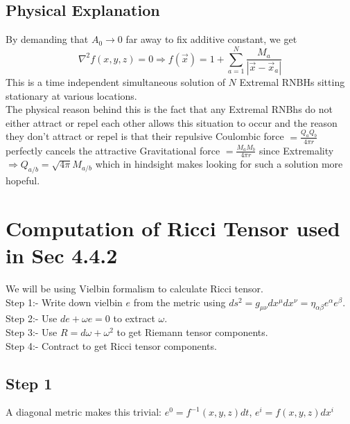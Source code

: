 ﻿\documentclass[12pt,a4paper]{article}
\begin{document}
\subsection{Physical Explanation}
By demanding that $A_{0} \rightarrow 0$ far away to fix additive constant, we get
$$
\nabla^{2} f(x, y, z)=0 \Rightarrow f(\vec{x})=1+\sum_{a=1}^{N} \frac{M_{a}}{\left|\vec{x}-\vec{x}_{a}\right|}
$$
This is a time independent simultaneous solution of $N$ Extremal RNBHs sitting stationary at various locations.\\
The physical reason behind this is the fact that any Extremal RNBhs do not either attract or repel each other allows this situation to occur and the reason they don't attract or repel is that their repulsive Coulombic force $=\frac{Q_{a}Q_{b}}{4 \pi r}$ perfectly cancels the attractive Gravitational force $=\frac{M_{a}M_{b}}{4 \pi r}$ since Extremality $\Rightarrow Q_{a/b}=\sqrt{4 \pi}M_{a/b}$ which in hindsight makes looking for such a solution more hopeful.


\newpage











\appendix


\section{Computation of Ricci Tensor used in Sec 4.4.2}
We will be using Vielbin formalism to calculate Ricci tensor.\\
Step 1:- Write down vielbin $e$ from the metric using $ds^{2}=g_{\mu \nu}dx^{\mu}dx^{\nu}=\eta_{\alpha \beta}e^{\alpha}e^{\beta}$.\\
Step 2:- Use $de+ \omega e=0$ to extract $\omega$.\\
Step 3:- Use $R=d\omega + \omega^{2}$ to get Riemann tensor components.\\
Step 4:- Contract to get Ricci tensor components.\\


\subsection{Step 1}
A diagonal metric makes this trivial:
$e^{0}=f^{-1}(x,y,z)dt$, $e^{i}=f(x,y,z)dx^{i}$
\end{document}
